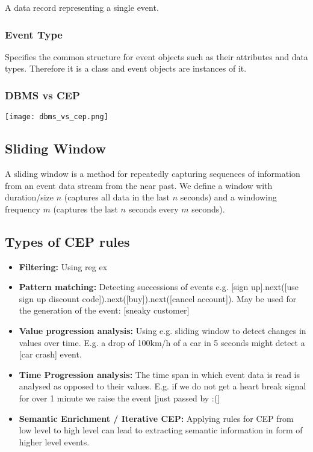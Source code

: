 A data record representing a single event.

\subsubsection*{Event Type}

Specifies the common structure for event objects such as their attributes and data types. Therefore it is a class and event objects are instances of it.

\subsubsection*{DBMS vs CEP}

\texttt{[image: dbms\_vs\_cep.png]}

\subsection{Sliding Window}

A sliding window is a method for repeatedly capturing sequences of information from an event data stream from the near past. We define a window with duration/size $n$ (captures all data in the last $n$ seconds) and a windowing frequency $m$ (captures the last $n$ seconds every $m$ seconds).

\subsection{Types of CEP rules}

\begin{itemize}
    \item \textbf{Filtering:} Using reg ex
    \item \textbf{Pattern matching:} Detecting successions of events e.g. [sign up].next([use sign up discount code]).next([buy]).next([cancel account]). May be used for the generation of the event: [sneaky customer]
    \item \textbf{Value progression analysis:} Using e.g. sliding window to detect changes in values over time. E.g. a drop of 100km/h of a car in 5 seconds might detect a [car crash] event.
    \item \textbf{Time Progression analysis:} The time span in which event data is read is analysed as opposed to their values. E.g. if we do not get a heart break signal for over 1 minute we raise the event [just passed by :(]
    \item \textbf{Semantic Enrichment / Iterative CEP:} Applying rules for CEP from low level to high level can lead to extracting semantic information in form of higher level events.
\end{itemize}

